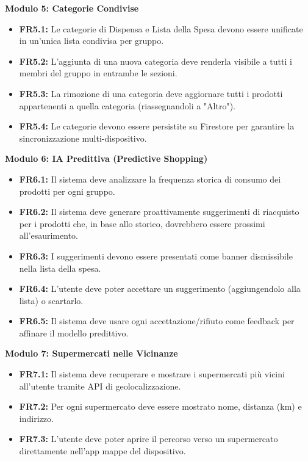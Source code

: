 \documentclass[12pt,a4paper]{article}
\begin{document}
\textbf{Modulo 5: Categorie Condivise}
\begin{itemize}
    \item \textbf{FR5.1:} Le categorie di Dispensa e Lista della Spesa devono essere unificate in un'unica lista condivisa per gruppo.
    \item \textbf{FR5.2:} L'aggiunta di una nuova categoria deve renderla visibile a tutti i membri del gruppo in entrambe le sezioni.
    \item \textbf{FR5.3:} La rimozione di una categoria deve aggiornare tutti i prodotti appartenenti a quella categoria (riassegnandoli a "Altro").
    \item \textbf{FR5.4:} Le categorie devono essere persistite su Firestore per garantire la sincronizzazione multi-dispositivo.
\end{itemize}

\textbf{Modulo 6: IA Predittiva (Predictive Shopping)}
\begin{itemize}
    \item \textbf{FR6.1:} Il sistema deve analizzare la frequenza storica di consumo dei prodotti per ogni gruppo.
    \item \textbf{FR6.2:} Il sistema deve generare proattivamente suggerimenti di riacquisto per i prodotti che, in base allo storico, dovrebbero essere prossimi all'esaurimento.
    \item \textbf{FR6.3:} I suggerimenti devono essere presentati come banner dismissibile nella lista della spesa.
    \item \textbf{FR6.4:} L'utente deve poter accettare un suggerimento (aggiungendolo alla lista) o scartarlo.
    \item \textbf{FR6.5:} Il sistema deve usare ogni accettazione/rifiuto come feedback per affinare il modello predittivo.
\end{itemize}

\textbf{Modulo 7: Supermercati nelle Vicinanze}
\begin{itemize}
    \item \textbf{FR7.1:} Il sistema deve recuperare e mostrare i supermercati più vicini all'utente tramite API di geolocalizzazione.
    \item \textbf{FR7.2:} Per ogni supermercato deve essere mostrato nome, distanza (km) e indirizzo.
    \item \textbf{FR7.3:} L'utente deve poter aprire il percorso verso un supermercato direttamente nell'app mappe del dispositivo.
\end{itemize}
\end{document}
